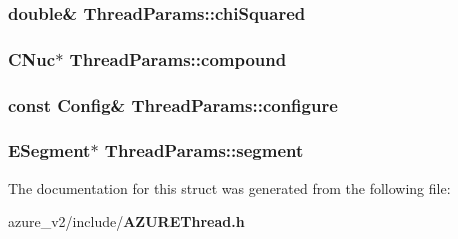 \subsubsection{\setlength{\rightskip}{0pt plus 5cm}double\& \bf{Thread\-Params::chi\-Squared}}\label{structThreadParams_a93bf8d0ecf7baaaedcd254366860bb8}


\subsubsection{\setlength{\rightskip}{0pt plus 5cm}\bf{CNuc}$\ast$ \bf{Thread\-Params::compound}}\label{structThreadParams_cee886b128a6d4a4a78b9871e265b024}


\subsubsection{\setlength{\rightskip}{0pt plus 5cm}const \bf{Config}\& \bf{Thread\-Params::configure}}\label{structThreadParams_a71cfd504a6b3604b3dd17963fc364f5}


\subsubsection{\setlength{\rightskip}{0pt plus 5cm}\bf{ESegment}$\ast$ \bf{Thread\-Params::segment}}\label{structThreadParams_a6f8335c4ba4b7429013fcedffd51279}




The documentation for this struct was generated from the following file:\begin{CompactItemize}
\item 
azure\_\-v2/include/\bf{AZUREThread.h}\end{CompactItemize}
